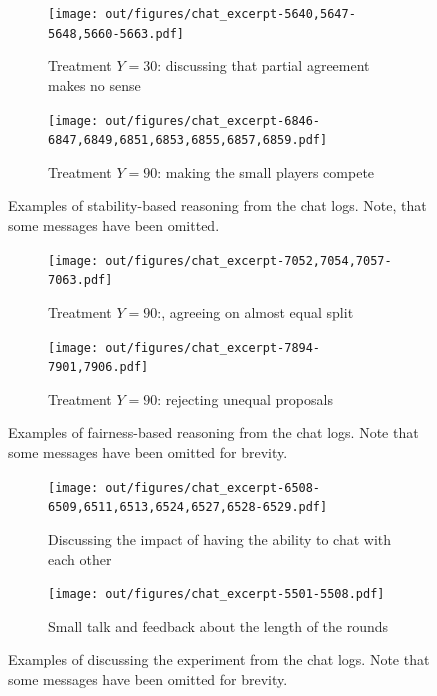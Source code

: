 \begin{figure}[!htb]
    \centering
    \begin{subfigure}[b]{0.42\textwidth}
        \centering
        \texttt{[image: out/figures/chat\_excerpt-5640,5647-5648,5660-5663.pdf]}
        \caption{Treatment $Y=30$: discussing that partial agreement makes no sense}
        \label{fig:chat_stability_y30}
    \end{subfigure}
    \hspace{0.1\textwidth}
    \begin{subfigure}[b]{0.42\textwidth}
        \centering
        \texttt{[image: out/figures/chat\_excerpt-6846-6847,6849,6851,6853,6855,6857,6859.pdf]}
        \caption{Treatment $Y=90$: making the small players compete}
        \label{fig:chat_stability_y90}
    \end{subfigure}
    \caption{Examples of stability-based reasoning from the chat logs. Note, that some messages have been omitted.}
    \label{fig:chat_stability}
\end{figure}

\begin{figure}[!htb]
    \centering
    \begin{subfigure}[b]{0.42\textwidth}
        \centering
        \texttt{[image: out/figures/chat\_excerpt-7052,7054,7057-7063.pdf]}
        \caption{Treatment $Y=90$:, agreeing on almost equal split}
        \label{fig:chat_fairness_equal_split}
    \end{subfigure}
    \hspace{0.1\textwidth}
    \begin{subfigure}[b]{0.42\textwidth}
        \centering
        \texttt{[image: out/figures/chat\_excerpt-7894-7901,7906.pdf]}
        \caption{Treatment $Y=90$: rejecting unequal proposals}
        \label{fig:chat_fairness_reject_small}
    \end{subfigure}
    \caption{Examples of fairness-based reasoning from the chat logs. Note that some messages have been omitted for brevity.}
    \label{fig:chat_fairness}
\end{figure}

\begin{figure}[!htb]
    \centering
    \begin{subfigure}[b]{0.42\textwidth}
        \centering
        \texttt{[image: out/figures/chat\_excerpt-6508-6509,6511,6513,6524,6527,6528-6529.pdf]}
        \caption{Discussing the impact of having the ability to chat with each other}
        \label{fig:chat_meta_chat}
    \end{subfigure}
    \hspace{0.1\textwidth}
    \begin{subfigure}[b]{0.42\textwidth}
        \centering
        \texttt{[image: out/figures/chat\_excerpt-5501-5508.pdf]}
        \caption{Small talk and feedback about the length of the rounds}
        \label{fig:chat_meta_time}
    \end{subfigure}
    \caption{Examples of discussing the experiment from the chat logs. Note that some messages have been omitted for brevity.}
    \label{fig:chat_meta}
\end{figure}

